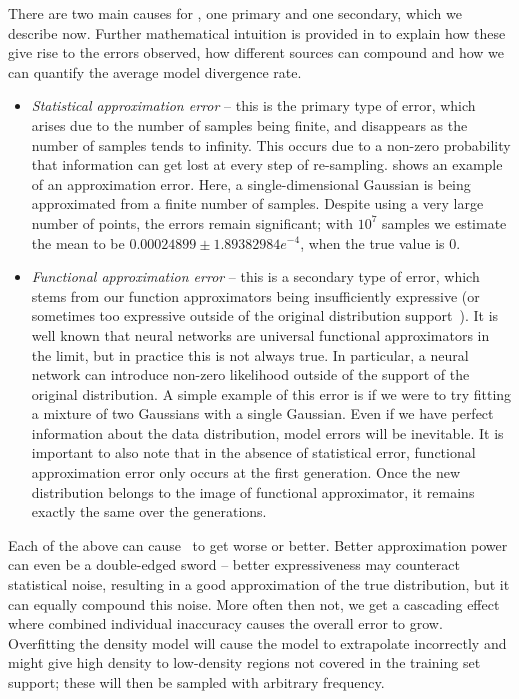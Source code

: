 There are two main causes for \md, one primary and one secondary, which we describe now. Further mathematical intuition is provided in  to explain how these give rise to the errors observed, how different sources can compound and how we can quantify the average model divergence rate. 
\begin{itemize}
    \item \textit{Statistical approximation error} -- this is the primary type of error, which arises due to the number of samples being finite, and disappears as the number of samples tends to infinity. This occurs due to a non-zero probability that information can get lost at every step of re-sampling.  shows an example of an approximation error. Here, a single-dimensional Gaussian is being approximated from a finite number of samples. Despite using a very large number of points, the errors remain significant; with $10^7$ samples we estimate the mean to be $0.00024899 \pm 1.89382984e^{-4}$, when the true value is $0$.
    \item \textit{Functional approximation error} -- this is a secondary type of error, which stems from our function approximators being insufficiently expressive (or sometimes too expressive outside of the original distribution support~\citep{nguyen2015deep}). It is well known that neural networks are universal functional approximators in the limit, but in practice this is not always true. In particular, a neural network can introduce non-zero likelihood outside of the support of the original distribution. A simple example of this error is if we were to try fitting a mixture of two Gaussians with a single Gaussian. Even if we have perfect information about the data distribution, model errors will be inevitable. It is important to also note that in the absence of statistical error, functional approximation error only occurs at the first generation. Once the new distribution belongs to the image of functional approximator, it remains exactly the same over the generations.
\end{itemize}

Each of the above can cause \md~to get worse or better. Better approximation power can even be a double-edged sword -- better expressiveness may counteract statistical noise, resulting in a good approximation of the true distribution, but it can equally compound this noise. More often then not, we get a cascading effect where combined individual inaccuracy causes the overall error to grow. Overfitting the density model will cause the model to extrapolate incorrectly and might give high density to low-density regions not covered in the training set support; these will then be sampled with arbitrary frequency.

